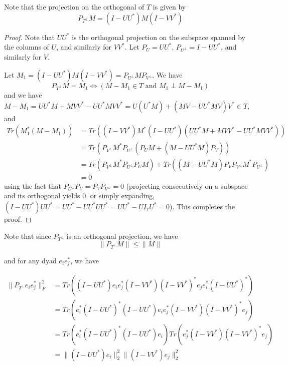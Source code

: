 Note that the projection on the orthogonal of $T$ is given by
\begin{equation}
P_{T^\perp} M = (I - UU^*)M(I - VV^*) \label{property: p1}
\end{equation}

\begin{proof}
Note that $UU^*$ is the orthogonal projection on the subspace spanned by the columns of $U$, and similarly for $VV^*$. Let $P_U = UU^*$, $P_{U^\perp} = I - UU^*$, and similarly for $V$.

Let $M_1 = (I - UU^*)M(I - VV^*) = P_{U^\perp} M P_{V^\perp}$. We have
\[
P_{T^\perp} M = M_1 \Leftrightarrow (M - M_1 \in T \text{ and } M_1 \perp M - M_1)
\]
and we have $M - M_1 = UU^*M + MVV^* - UU^*MVV^* = U(U^*M) + (MV - UU^*MV)V^* \in T$, and
\begin{align*}
Tr(M_1^* (M - M_1))
&= Tr((I-VV^*)M^*(I-UU^*)(UU^*M + MVV^* - UU^*MVV^*)) \\
&= Tr(P_{V^\perp}M^*P_{U^\perp}(P_UM + (M - UU^*M)P_V)) \\
&= Tr(P_{V^\perp}M^*P_{U^\perp}P_UM) + Tr((M - UU^*M)P_VP_{V^\perp}M^*P_{U^\perp})\\
&=0
\end{align*}
using the fact that $P_{U^\perp}P_U = P_V P_{V^\perp} = 0$ (projecting consecutively on a subspace and its orthogonal yields 0, or simply expanding, $(I-UU^*)UU^* = UU^* - UU^*UU^* = UU^* - U I_r U^* = 0$). This completes the proof.
\end{proof}

Note that since $P_{T^\perp}$ is an orthogonal projection, we have
\begin{equation}
\| P_{T^\perp} M \| \leq \|M\| \label{property: p2}
\end{equation}

and for any dyad $e_i e_j^*$, we have


\begin{align*}
\|P_{T^\perp} e_ie_j^*\|_F^2
&= Tr\left( (I-UU^*)e_ie_j^*(I-VV^*)(I-VV^*)^*e_je_i^*(I-UU^*)^* \right) \\
&= Tr\left( e_i^*(I-UU^*)^*(I-UU^*)e_ie_j^*(I-VV^*)(I-VV^*)^*e_j \right) \\
&= Tr\left( e_i^*(I-UU^*)^*(I-UU^*)e_i\right) Tr \left(e_j^*(I-VV^*)(I-VV^*)^*e_j \right) \\
&= \|(I - UU^*)e_i\|_2^2 \|(I - VV^*)e_j\|_2^2
\end{align*}

